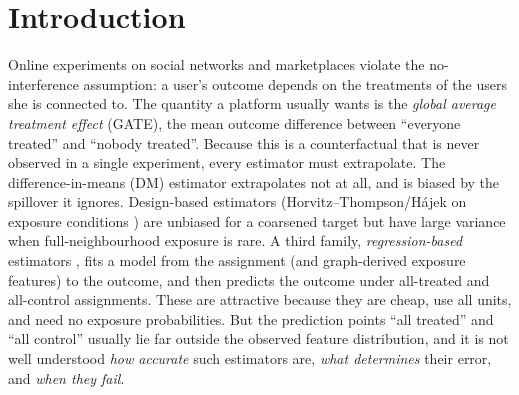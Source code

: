 \section{Introduction}
Online experiments on social networks and marketplaces violate the no-interference assumption: a user's outcome depends on the treatments of the users she is connected to. The quantity a platform usually wants is the \emph{global average treatment effect} (GATE), the mean outcome difference between ``everyone treated'' and ``nobody treated''. Because this is a counterfactual that is never observed in a single experiment, every estimator must extrapolate. The difference-in-means (DM) estimator extrapolates not at all, and is biased by the spillover it ignores. Design-based estimators (Horvitz--Thompson/H\'ajek on exposure conditions \citep{aronow2017,ugander2013}) are unbiased for a coarsened target but have large variance when full-neighbourhood exposure is rare. A third family, \emph{regression-based} estimators \citep{chin2019,han2023}, fits a model from the assignment (and graph-derived exposure features) to the outcome, and then predicts the outcome under all-treated and all-control assignments. These are attractive because they are cheap, use all units, and need no exposure probabilities. But the prediction points ``all treated'' and ``all control'' usually lie far outside the observed feature distribution, and it is not well understood \emph{how accurate} such estimators are, \emph{what determines} their error, and \emph{when they fail}.

